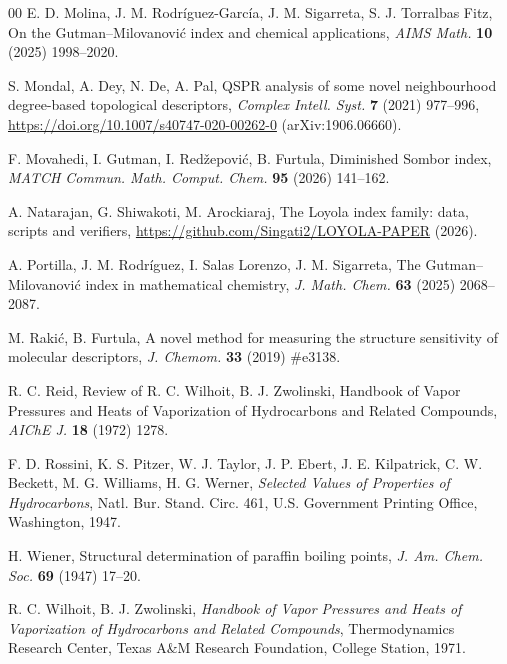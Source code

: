 \documentclass[a5paper, 10pt]{article}
\theoremstyle{plain}
\theoremstyle{remark}
\theoremstyle{definition}
\begin{document}
\begin{thebibliography}{00}
   E. D. Molina, J. M.
  Rodr\'iguez-Garc\'ia, J. M. Sigarreta, S. J. Torralbas Fitz, On the
  Gutman--Milovanovi\'c index and chemical applications, \textit{AIMS
  Math.\/} \textbf{10} (2025) 1998--2020.

  S. Mondal, A. Dey, N. De, A. Pal, QSPR analysis of some novel
  neighbourhood degree-based topological descriptors, \textit{Complex
  Intell. Syst.\/} \textbf{7} (2021) 977--996,
  \url{https://doi.org/10.1007/s40747-020-00262-0} (arXiv:1906.06660).

   F. Movahedi, I. Gutman, I.
  Red\v{z}epovi\'c, B. Furtula, Diminished Sombor index, \textit{MATCH Commun.
  Math. Comput. Chem.\/} \textbf{95} (2026) 141--162.

   A. Natarajan, G. Shiwakoti, M. Arockiaraj,
  The Loyola index family: data, scripts and verifiers,
  \url{https://github.com/Singati2/LOYOLA-PAPER} (2026).

   A. Portilla, J. M. Rodr\'iguez,
  I. Salas Lorenzo, J. M. Sigarreta, The Gutman--Milovanovi\'c index
  in mathematical chemistry, \textit{J. Math. Chem.\/} \textbf{63}
  (2025) 2068--2087.

   M. Raki\'c, B. Furtula, A novel method for
  measuring the structure sensitivity of molecular descriptors, \textit{J. Chemom.\/} \textbf{33} (2019) \#e3138.

   R. C. Reid, Review of R. C. Wilhoit, B. J. Zwolinski, Handbook
  of Vapor Pressures and Heats of Vaporization of Hydrocarbons and Related
  Compounds, \textit{AIChE J.\/} \textbf{18} (1972) 1278.

   F. D. Rossini, K. S. Pitzer, W. J. Taylor,
  J. P. Ebert, J. E. Kilpatrick, C. W. Beckett, M. G. Williams, H. G. Werner,
  \textit{Selected Values of Properties of Hydrocarbons\/}, Natl. Bur.
  Stand. Circ. 461, U.S. Government Printing Office, Washington, 1947.

   H. Wiener, Structural determination of paraffin boiling
  points, \textit{J. Am. Chem. Soc.\/} \textbf{69} (1947) 17--20.

   R. C. Wilhoit, B. J. Zwolinski,
  \textit{Handbook of Vapor Pressures and Heats of Vaporization of
  Hydrocarbons and Related Compounds\/}, Thermodynamics Research Center, Texas A\&M Research Foundation,
  College Station, 1971.

\end{thebibliography}
\end{document}
